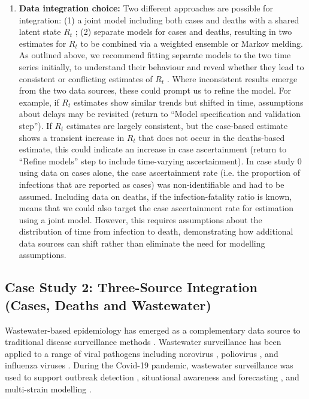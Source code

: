 \documentclass{article}
\begin{document}
\begin{enumerate}
    \item \textbf{Data integration choice:} 
       Two different approaches are possible for integration: (1) a joint model including both cases and deaths with a shared latent state $R_t$ \citep{scott2020epidemia}; (2) separate models for cases and deaths, resulting in two estimates for $R_t$ to be combined via a weighted ensemble or Markov melding.
        As outlined above, we recommend fitting separate models to the two time series initially, to understand their behaviour and reveal whether they lead to consistent or conflicting estimates of $R_t$ \citep{sherratt2021exploring}. Where inconsistent results emerge from the two data sources, these could prompt us to refine the model. For example, if $R_t$ estimates show similar trends but shifted in time, assumptions about delays may be revisited (return to ``Model specification and validation step''). If $R_t$ estimates are largely consistent, but the case-based estimate shows a transient increase in $R_t$ that does not occur in the deaths-based estimate, this could indicate an increase in case ascertainment (return to ``Refine models'' step to include time-varying ascertainment). In case study 0 using data on cases alone, the case ascertainment rate (i.e. the proportion of infections that are reported as cases) was non-identifiable and had to be assumed. Including data on deaths, if the infection-fatality ratio is known, means that we could also target the case ascertainment rate for estimation using a joint model. However, this requires assumptions about the distribution of time from infection to death, demonstrating how additional data sources can shift rather than eliminate the need for modelling assumptions. 
\end{enumerate}

\subsection{Case Study 2: Three-Source Integration (Cases, Deaths and Wastewater)}

Wastewater-based epidemiology has emerged as a complementary data source to traditional disease surveillance methods \citep{keshaviah2023wastewater}. Wastewater surveillance has been applied to a range of viral pathogens including norovirus \citep{zheng2024tracking}, poliovirus \citep{whitehouse2024wastewater}, and influenza viruses \citep{zheng2023development}. During the Covid-19 pandemic, wastewater surveillance was used to support outbreak detection \citep{hewitt2022sensitivity}, situational awareness and forecasting \citep{varkila2023use,jin2024combining}, and multi-strain modelling \citep{dreifuss2025estimated}. 
\end{document}
